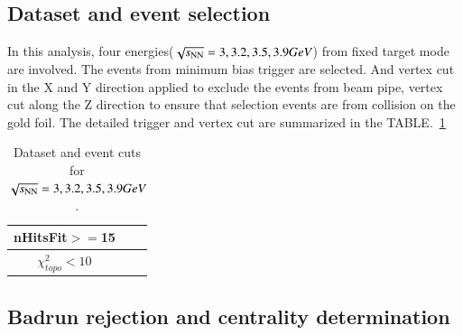 \subsection{Dataset and event selection}

In this analysis, four energies($\sqrt{s_\text{NN}}=3, 3.2, 3.5, 3.9 GeV$) from fixed target mode are involved.
The events from minimum bias trigger are selected. And vertex cut in the X and Y direction applied to exclude the events from beam pipe, 
vertex cut along the Z direction to ensure that selection events are from collision on the gold foil.
The detailed trigger and vertex cut are summarized in the TABLE.~\ref{tab:dataset}
\begin{table}
\caption{Dataset and event cuts for $\sqrt{s_\text{NN}}=3, 3.2, 3.5, 3.9 GeV$.}
\label{tab:dataset}
\begin{tabular}{|c|c|c|}
\hline
nHitsFit$>=$15 \\ \hline
$\chi^{2}_{topo}<10$ \\ \hline
\end{tabular}
\end{table}


\subsection{Badrun rejection and centrality determination}
